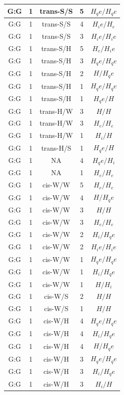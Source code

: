 \begin{center}
\begin{longtable}{c|c|c|c|c}
G:G & 1 & trans-S/S & 5 & $H_qe/H_qe$ \\  \hline
G:G & 1 & trans-S/S & 4 & $H_ie/H_e$ \\  \hline
G:G & 1 & trans-S/S & 3 & $H_ie/H_ie$ \\  \hline
G:G & 1 & trans-S/H & 5 & $H_e/H_ie$ \\  \hline
G:G & 1 & trans-S/H & 3 & $H_qe/H_qe$ \\  \hline
G:G & 1 & trans-S/H & 2 & $H/H_qe$ \\  \hline
G:G & 1 & trans-S/H & 1 & $H_qe/H_qe$ \\  \hline
G:G & 1 & trans-S/H & 1 & $H_qe/H$ \\  \hline
G:G & 1 & trans-H/W & 3 & $H/H$ \\  \hline
G:G & 1 & trans-H/W & 3 & $H_e/H_e$ \\  \hline
G:G & 1 & trans-H/W & 1 & $H_i/H$ \\  \hline
G:G & 1 & trans-H/S & 1 & $H_qe/H$ \\  \hline
G:G & 1 & NA & 4 & $H_qe/H_i$ \\  \hline
G:G & 1 & NA & 1 & $H_e/H_e$ \\  \hline
G:G & 1 & cis-W/W & 5 & $H_e/H_e$ \\  \hline
G:G & 1 & cis-W/W & 4 & $H/H_qe$ \\  \hline
G:G & 1 & cis-W/W & 3 & $H/H$ \\  \hline
G:G & 1 & cis-W/W & 3 & $H_e/H_e$ \\  \hline
G:G & 1 & cis-W/W & 2 & $H_i/H_qe$ \\  \hline
G:G & 1 & cis-W/W & 2 & $H_ie/H_ie$ \\  \hline
G:G & 1 & cis-W/W & 1 & $H_qe/H_qe$ \\  \hline
G:G & 1 & cis-W/W & 1 & $H_i/H_qe$ \\  \hline
G:G & 1 & cis-W/W & 1 & $H/H_i$ \\  \hline
G:G & 1 & cis-W/S & 2 & $H/H$ \\  \hline
G:G & 1 & cis-W/S & 1 & $H/H$ \\  \hline
G:G & 1 & cis-W/H & 4 & $H_qe/H_qe$ \\  \hline
G:G & 1 & cis-W/H & 4 & $H_i/H_qe$ \\  \hline
G:G & 1 & cis-W/H & 4 & $H/H_qe$ \\  \hline
G:G & 1 & cis-W/H & 3 & $H_qe/H_qe$ \\  \hline
G:G & 1 & cis-W/H & 3 & $H_i/H_qe$ \\  \hline
G:G & 1 & cis-W/H & 3 & $H_i/H$ \\  \hline

\end{longtable}
\end{center}
